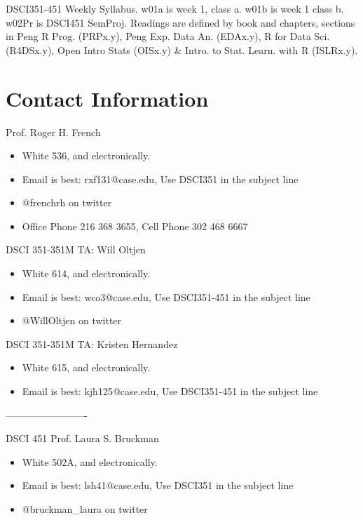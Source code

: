 \documentclass[10pt]{article} %
\begin{document}
\begin{table}[h]
  \caption{DSCI351-451 Weekly Syllabus. w01a is week 1, class a. w01b is week 1 class b. w02Pr is DSCI451 SemProj. Readings are defined by book and chapters, sections in Peng R Prog. (PRPx.y), Peng Exp. Data An. (EDAx.y), R for Data Sci. (R4DSx.y), Open Intro Stats (OISx.y) \& Intro. to Stat. Learn. with R (ISLRx.y).}
  \label{table:Syllabus} %
\end{table}

\FloatBarrier

\section{Contact Information}

  Prof. Roger H. French
  \begin{itemize}
  	\item White 536, and electronically.
  	\item Email is best: rxf131@case.edu, Use DSCI351 in the subject line
  	\item @frenchrh on twitter
  	\item Office Phone 216 368 3655, Cell Phone 302 468 6667
  \end{itemize}

DSCI 351-351M TA: Will Oltjen
  \begin{itemize}
    \item White 614, and electronically.
    \item Email is best: wco3@case.edu, Use DSCI351-451 in the subject line
    \item @WillOltjen on twitter
  \end{itemize}

DSCI 351-351M TA: Kristen Hernandez
  \begin{itemize}
    \item White 615, and electronically.
    \item Email is best: kjh125@case.edu, Use DSCI351-451 in the subject line
  \end{itemize}

-------------------------

  DSCI 451 Prof. Laura S. Bruckman
  \begin{itemize}
    \item White 502A, and electronically.
    \item Email is best: lsh41@case.edu, Use DSCI351 in the subject line
    \item @bruckman\_laura on twitter
  \end{itemize}
\end{document}
